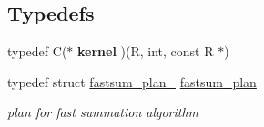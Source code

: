 \subsection*{Typedefs}
\begin{DoxyCompactItemize}
\item 
\hypertarget{group__applications__fastsum_gaec089d15af3b9dab1c1fc1bedfb30e07}{typedef C($\ast$ {\bfseries kernel} )(R, int, const R $\ast$)}\label{group__applications__fastsum_gaec089d15af3b9dab1c1fc1bedfb30e07}

\item 
\hypertarget{group__applications__fastsum_gad953252f6b309404991c4afc7b98b34b}{typedef struct \hyperlink{structfastsum__plan__}{fastsum\-\_\-plan\-\_\-} \hyperlink{group__applications__fastsum_gad953252f6b309404991c4afc7b98b34b}{fastsum\-\_\-plan}}\label{group__applications__fastsum_gad953252f6b309404991c4afc7b98b34b}

\begin{DoxyCompactList}\small\item\em plan for fast summation algorithm \end{DoxyCompactList}\end{DoxyCompactItemize}

